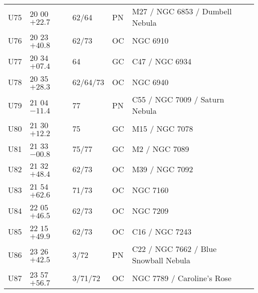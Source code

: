 \begin{table}[p]
\begin{tabular}{llllll}
U75&$20$ $00$ $+22.7$&62/64&PN&M27 / NGC 6853 / Dumbell Nebula\\
U76&$20$ $23$ $+40.8$&62/73&OC&NGC 6910\\
U77&$20$ $34$ $+07.4$&64&GC&C47 / NGC 6934\\
U78&$20$ $35$ $+28.3$&62/64/73&OC&NGC 6940\\
U79&$21$ $04$ $-11.4$&77&PN&C55 / NGC 7009 / Saturn Nebula\\
U80&$21$ $30$ $+12.2$&75&GC&M15 / NGC 7078\\
U81&$21$ $33$ $-00.8$&75/77&GC&M2 / NGC 7089\\
U82&$21$ $32$ $+48.4$&62/73&OC&M39 / NGC 7092\\
U83&$21$ $54$ $+62.6$&71/73&OC&NGC 7160\\
U84&$22$ $05$ $+46.5$&62/73&OC&NGC 7209\\
U85&$22$ $15$ $+49.9$&62/73&OC&C16 / NGC 7243\\
U86&$23$ $26$ $+42.5$&3/72&PN&C22 / NGC 7662 / Blue Snowball Nebula\\
U87&$23$ $57$ $+56.7$&3/71/72&OC&NGC 7789 / Caroline’s Rose\\
\hline
\end{tabular}
\end{table}

\clearpage

\twocolumn


\onecolumn
